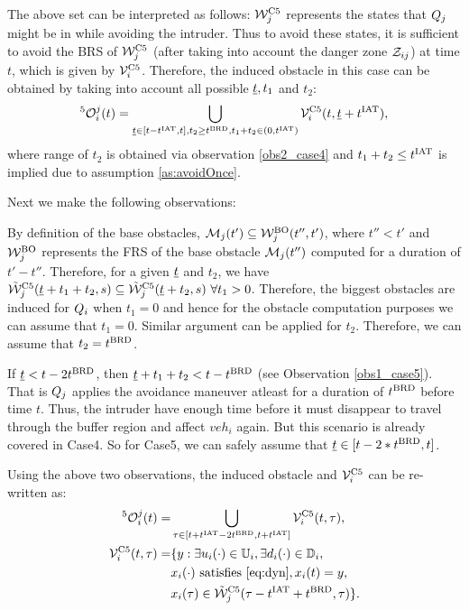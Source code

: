 The above set can be interpreted as follows: $\mathcal{W}_j^{\text{C5}}$ represents the states that $Q_j$ might be in while avoiding the intruder. Thus to avoid these states, it is sufficient to avoid the BRS of $\mathcal{W}_j^{\text{C5}}$ (after taking into account the danger zone $\mathcal{Z}_{ij}$) at time $t$, which is given by $\mathcal{V}^{\text{C5}}_{i}$. Therefore, the induced obstacle in this case can be obtained by taking into account all possible $\underline{t}, t_1$ and $t_2$:
\begin{equation} \label{eq:intruderObs_case5_alt1} 
^5\ioset_i^j(t) = \bigcup_{\tsa \in [t-\iat, t], t_2 \geq \brd, t_1 + t_2 \in (0, \iat)} \brs^{\text{C5}}_{i}(t, \tsa + \iat),
\end{equation}
where range of $t_2$ is obtained via observation \ref{obs2_case4} and $t_1 + t_2 \leq t^\text{IAT}$ is implied due to assumption \ref{as:avoidOnce}.

Next we make the following observations:
\begin{observation} \label{obs1_case5}
By definition of the base obstacles, $\mathcal{M}_j(t') \subseteq \mathcal{W}_j^{\text{BO}}(t'', t')$, where $t'' < t'$ and $\mathcal{W}_j^{\text{BO}}$ represents the FRS of the base obstacle $\mathcal{M}_j(t'')$ computed for a duration of $t' - t''$. Therefore, for a given $\underline{t}$ and $t_2$, we have $\tilde{\mathcal{W}}_j^{\text{C5}}(\underline{t}+t_1+t_2, s) \subseteq \tilde{\mathcal{W}}_j^{\text{C5}}(\underline{t}+t_2, s) ~\forall t_1 >0$. Therefore, the biggest obstacles are induced for $Q_i$ when $t_1 = 0$ and hence for the obstacle computation purposes we can assume that $t_1 = 0$. Similar argument can be applied for $t_2$. Therefore, we can assume that $t_2 = t^\text{BRD}$. 
\end{observation}

\begin{observation} \label{obs2_case5}
If $\underline{t} < t- 2t^\text{BRD}$, then $\underline{t} + t_1 + t_2 < t - t^\text{BRD}$ (see Observation \ref{obs1_case5}). That is $Q_j$ applies the avoidance maneuver atleast for a duration of $t^\text{BRD}$ before time $t$. Thus, the intruder have enough time before it must disappear to travel through the buffer region and affect $veh_i$ again. But this scenario is already covered in Case4. So for Case5, we can safely assume that $\underline{t} \in [t-2*t^\text{BRD}, t]$. 
\end{observation}
Using the above two observations, the induced obstacle and $\mathcal{V}^{\text{C5}}_{i}$ can be re-written as:
\begin{equation} \label{eq:intruderObs_case5} 
\begin{aligned}
^5\ioset_i^j(t) = & \bigcup_{\tau \in [t+\iat -2\brd, t+\iat]} \brs^{\text{C5}}_{i}(t, \tau),\\
\brs^{\text{C5}}_{i}(t, \tau) = & \{y: \exists \ctrl_i(\cdot) \in \cfset_i, \exists \dstb_i(\cdot) \in \dfset_i, \\
& \state_i(\cdot) \text{ satisfies \eqref{eq:dyn}}, \state_i(t) = y, \\
& \state_i(\tau) \in \tilde{\frs}_j^{\text{C5}}(\tau-\iat+\brd, \tau)\}.
\end{aligned}
\end{equation}

